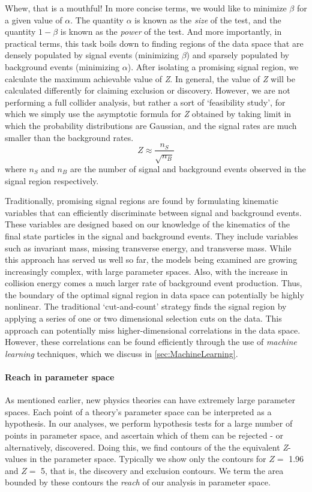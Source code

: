 Whew, that is a mouthful! In more concise terms, we would like to minimize $\beta$ for a given value of $\alpha$. The quantity $\alpha$ is known as the \emph{size} of the test, and the quantity $1-\beta$ is known as the \emph{power} of the test. And more importantly, in practical terms, this task boils down to finding regions of the data space that are densely populated by signal events (minimizing $\beta$) and sparsely populated by background events (minimizing $\alpha$). After isolating a promising signal region, we calculate the maximum achievable value of \emph{Z}. In general, the value of \emph{Z} will be calculated differently for claiming exclusion or discovery. However, we are not performing a full collider analysis, but rather a sort of `feasibility study', for which we simply use the asymptotic formula for \emph{Z} obtained by taking limit in which the probability distributions are Gaussian, and the signal rates are much smaller than the background rates.
\[Z \approx \frac{n_S}{\sqrt{n_B}}\]
where $n_S$ and $n_B$ are the number of signal and background events observed in the signal region respectively.

Traditionally, promising signal regions are found by formulating kinematic variables that can efficiently discriminate between signal and background events. These variables are designed based on our knowledge of the kinematics of the final state particles in the signal and background events. They include variables such as invariant mass, missing transverse energy, and transverse mass. While this approach has served us well so far, the models being examined are growing increasingly complex, with large parameter spaces. Also, with the increase in collision energy comes a much larger rate of background event production. Thus, the boundary of the optimal signal region in data space can potentially be highly nonlinear. The traditional `cut-and-count' strategy finds the signal region by applying a series of one or two dimensional selection cuts on the data. This approach can potentially miss higher-dimensional correlations in the data space. However, these correlations can be found efficiently through the use of \emph{machine learning} techniques, which we discuss in \autoref{sec:MachineLearning}.
\paragraph{Reach in parameter space} As mentioned earlier, new physics theories can have extremely large parameter spaces. Each point of a theory's parameter space can be interpreted as a hypothesis. In our analyses, we perform hypothesis tests for a large number of points in parameter space, and ascertain which of them can be rejected - or alternatively, discovered. Doing this, we find contours of the the equivalent \emph{Z}-values in the parameter space. Typically we show only the contours for $Z =$ 1.96 and $Z=$ 5, that is, the discovery and exclusion contours. We term the area bounded by these contours the \emph{reach} of our analysis in parameter space. 

